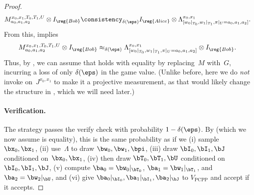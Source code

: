 \begin{proof}
\begin{equation}
M^{x_0, x_1, T_0, T_1, U}_{a_0, a_1, a_2} \otimes I_{\reg{Bob}}\consistency_{\delta(\eps)}
I_{\reg{Alice}} \otimes \Lambda^{x_0, x_1}_{[w_0|_{T_0}, w_1|_{T_1}, \pi|_{U} = a_0, a_1, a_2]}.
\end{equation}
From this,  implies
\begin{equation}\label{eq:gonna-use-this-once}
M^{x_0, x_1, T_0, T_1, U}_{a_0, a_1, a_2} \otimes I_{\reg{Bob}}\approx_{\delta(\eps)}
\Lambda^{x_0, x_1}_{[w_0|_{T_0}, w_1|_{T_1}, \pi|_{U} = a_0, a_1, a_2]} \otimes I_{\reg{Bob}}.
\end{equation}
Thus, by , we can assume that  holds with equality by replacing~$M$ with~$G$,
incurring a loss of only $\delta(\eps)$ in the game value.
(Unlike before, here we do \emph{not} invoke  on~$J^{x_0, x_1}$ to make it a projective measurement,
as that would likely change the structure in , which we will need later.)

\paragraph{Verification.}
The strategy passes the verify check with probability $1-\delta(\eps)$.  
By 
(which we now assume is equality),
this is the same probability as if we (i) sample~$\bx_0, \bx_1$,
(ii) use~$\Lambda$ to draw $\bw_0, \bw_1, \bpi$,
(iii) draw $\bI_0, \bI_1, \bJ$ conditioned on~$\bx_0, \bx_1$,
(iv) then draw $\bT_0, \bT_1, \bU$ conditioned on~$\bI_0, \bI_1, \bJ$,
(v) compute $\ba_0 = \bw_0|_{\bT_0}$, $\ba_1 = \bw_1|_{\bT_1}$, and $\ba_2 = \bw_2|_{\bU}$,
and (vi) give $\ba_0|_{\bI_0}, \ba_1|_{\bI_1}, \ba_2|_{\bJ}$ to $V_{\mathrm{PCPP}}$ and accept if it accepts.


\end{proof}
